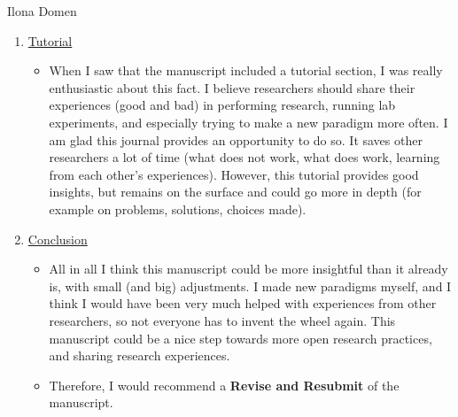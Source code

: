 \documentclass[twocolumn, serif, authordate, review]{jote-article}
\begin{document}
\begin{paracol}{2}
\begin{reviewend}{Ilona Domen}
\begin{enumerate}[label=\textbf{\arabic*}), start=0]
\begin{enumerate}
        \end{enumerate}
        
        \item \hyperref[sec:tutorial]{Tutorial}
            \begin{itemize}
                \item When I saw that the manuscript included a tutorial section, I was really enthusiastic about this fact. I believe researchers should share their experiences (good and bad) in performing research, running lab experiments, and especially trying to make a new paradigm more often. I am glad this journal provides an opportunity to do so. It saves other researchers a lot of time (what does not work, what does work, learning from each other's experiences). However, this tutorial provides good insights, but remains on the surface and could go more in depth (for example on problems, solutions, choices made).
            \end{itemize}
            
        \item \hyperref[sec:conclusion]{Conclusion}
            \begin{itemize}
                \item All in all I think this manuscript could be more insightful than it already is, with small (and big) adjustments. I made new paradigms myself, and I think I would have been very much helped with experiences from other researchers, so not everyone has to invent the wheel again. This manuscript could be a nice step towards more open research practices, and sharing research experiences. 
                \item Therefore, I would recommend a \textbf{Revise and Resubmit} of the manuscript.
            \end{itemize}
    \end{enumerate}
\end{reviewend}


\end{paracol}
\end{document}
